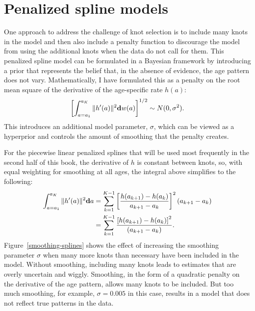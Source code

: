 \section{Penalized spline models}
One approach to address the challenge of knot selection is to include
many knots in the model and then also include a penalty function to
discourage the model from using the additional knots when the data
do not call for them.  This penalized spline model can be formulated in a
Bayesian framework by introducing a prior that represents the belief that, in
the absence of evidence, the age pattern does not vary.
Mathematically, I have formulated this as a penalty on the root mean
square of the derivative of the age-specific rate $h(a)$:
\[
\left[\int _{a=a_1} ^{a_K} \| h'(a) \|^2 \mathbf{d} w(a)\right]^{1/2} \sim N(0, \sigma^2).
\]
This introduces an additional model parameter, $\sigma$, which can be
viewed as a hyperprior and controls the amount of smoothing that the
penalty creates.

For the piecewise linear penalized splines that will be used most
frequently in the second half of this book, the derivative of $h$ is
constant between knots, so, with equal weighting for smoothing at all
ages, the integral above simplifies to the following:
\begin{align*}
\int _{a=a_1} ^{a_K} \| h'(a) \|^2 \mathbf{d} a
& = \sum_{k=1} ^{K-1} \left[\frac{h(a_{k+1}) - h(a_k)}{a_{k+1}-a_k}\right]^2 (a_{k+1}-a_k)\\
&= \sum_{k=1} ^{K-1} \frac{\left[h(a_{k+1}) - h(a_k)\right]^2}{(a_{k+1}-a_k)}.
\end{align*}
Figure~\ref{smoothing-splines} shows the effect of increasing the
smoothing parameter $\sigma$ when many more knots than necessary have been included in the model.
  Without smoothing, including many knots leads to
  estimates that are overly uncertain and wiggly.  Smoothing, in the
  form of a quadratic penalty on the derivative of the age pattern,
  allows many knots to be included.  But too much smoothing, for
  example, $\sigma=0.005$ in this case, results in a model that does
  not reflect true patterns in the data.

